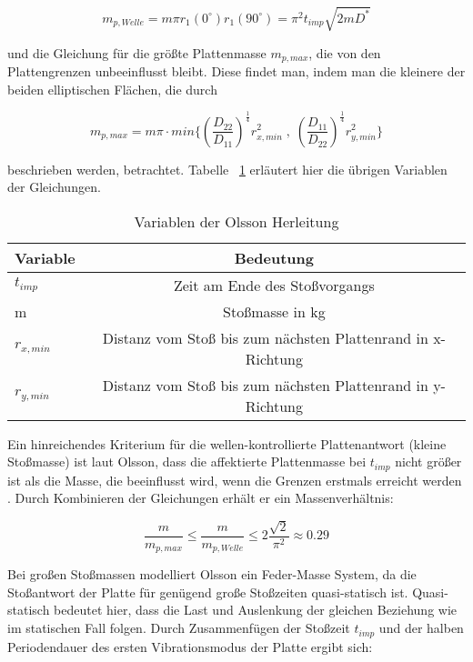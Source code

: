 \begin{equation}
	m_{p,Welle} = m \pi r_{1}(0^{\circ}) r_{1}(90^{\circ}) = \pi^{2} t_{imp} \sqrt{2mD^{*}}
\end{equation}

und die Gleichung für die größte Plattenmasse $m_{p,max}$, die von den Plattengrenzen unbeeinflusst bleibt. Diese findet man, indem man die kleinere der beiden elliptischen Flächen, die durch

\begin{equation}
	m_{p,max} = m \pi \cdot min\{(\frac{D_{22}}{D_{11}})^{\frac{1}{4}} r_{x,min}^{2} \; , \; (\frac{D_{11}}{D_{22}})^{\frac{1}{4}} r_{y,min}^{2} \}
\end{equation}		
		
beschrieben werden, betrachtet. Tabelle ~\ref{tab:Tabelle 2} erläutert hier die übrigen Variablen der Gleichungen.

\begin{table}[h!]
	\begin{center}
		\caption{Variablen der Olsson Herleitung}
		\label{tab:Tabelle 2}
		\begin{tabular}{l|c}
			\textbf{Variable} & \textbf{Bedeutung}\\
			\hline
			$t_{imp}$ & Zeit am Ende des Stoßvorgangs\\
			m & Stoßmasse in kg\\
			$r_{x,min}$ & Distanz vom Stoß bis zum nächsten Plattenrand in x-Richtung\\
			$r_{y,min}$ & Distanz vom Stoß bis zum nächsten Plattenrand in y-Richtung\\
		\end{tabular}
	\end{center}
\end{table}

Ein hinreichendes Kriterium für die wellen-kontrollierte Plattenantwort (kleine Stoßmasse) ist laut Olsson, dass die affektierte Plattenmasse bei $t_{imp}$ nicht größer ist als die Masse, die beeinflusst wird, wenn die Grenzen erstmals erreicht werden \cite{Olsson.2000}. Durch Kombinieren der Gleichungen erhält er ein Massenverhältnis:

\begin{equation}
	\frac{m}{m_{p,max}} \leq \frac{m}{m_{p,Welle}} \leq 2 \frac{\sqrt{2}}{\pi^{2}} \approx 0.29
\end{equation}

Bei großen Stoßmassen modelliert Olsson ein Feder-Masse System, da die Stoßantwort der Platte für genügend große Stoßzeiten quasi-statisch ist. Quasi-statisch bedeutet hier, dass die Last und Auslenkung der gleichen Beziehung wie im statischen Fall folgen. Durch Zusammenfügen der Stoßzeit $t_{imp}$ und der halben Periodendauer des ersten Vibrationsmodus der Platte ergibt sich: 

